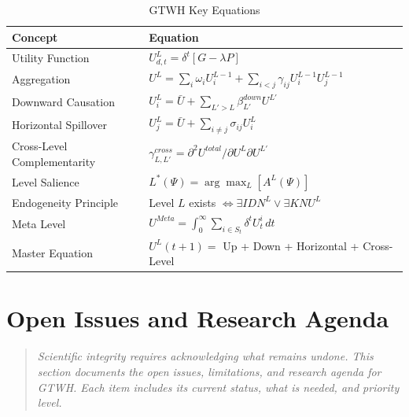 \begin{table}[htbp]
\centering
\caption{GTWH Key Equations}
\label{tab:aaa-key-equations}
\renewcommand{\arraystretch}{1.4}
\small
\begin{tabular}{@{}p{4cm}p{8cm}@{}}
\toprule
\textbf{Concept} & \textbf{Equation} \\
\midrule
Utility Function & $U^L_{d,t} = \delta^t [G - \lambda P]$ \\
Aggregation & $U^L = \sum_i \omega_i U^{L-1}_i + \sum_{i<j} \gamma_{ij} U^{L-1}_i U^{L-1}_j$ \\
Downward Causation & $U^L_i = \bar{U} + \sum_{L'>L} \beta^{down}_{L'} U^{L'}$ \\
Horizontal Spillover & $U^L_j = \bar{U} + \sum_{i \neq j} \sigma_{ij} U^L_i$ \\
Cross-Level Complementarity & $\gamma^{cross}_{L,L'} = \partial^2 U^{total} / \partial U^L \partial U^{L'}$ \\
Level Salience & $L^*(\Psi) = \arg\max_L [A^L(\Psi)]$ \\
Endogeneity Principle & Level $L$ exists $\iff \exists IDN^L \lor \exists KNU^L$ \\
Meta Level & $U^{Meta} = \int_0^\infty \sum_{i \in S_t} \delta^t U^i_t \, dt$ \\
Master Equation & $U^L(t+1) = $ Up + Down + Horizontal + Cross-Level \\
\bottomrule
\end{tabular}
\end{table}



\section{Open Issues and Research Agenda}
\label{sec:aaa-open-issues}

\begin{quote}
\textit{Scientific integrity requires acknowledging what remains undone. This 
section documents the open issues, limitations, and research agenda for GTWH. 
Each item includes its current status, what is needed, and priority level.}
\end{quote}


